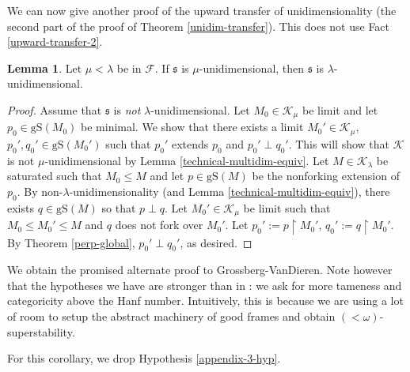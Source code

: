 \documentclass[12pt]{amsart}
\theoremstyle{definition}
\newtheorem{lem}[mydef]{Lemma}
\begin{document}
We can now give another proof of the upward transfer of unidimensionality (the second part of the proof of Theorem \ref{unidim-transfer}). This does not use Fact \ref{upward-transfer-2}.

\begin{lem}\label{unidim-upward}
  Let $\mu < \lambda$ be in ${\mathcal{F}}$. If ${\mathfrak{s}}$ is $\mu$-unidimensional, then ${\mathfrak{s}}$ is $\lambda$-unidimensional.
\end{lem}
\begin{proof}
  Assume that ${\mathfrak{s}}$ is \emph{not} $\lambda$-unidimensional. Let $M_0 \in {\mathcal{K}}_{\mu}$ be limit and let $p_0 \in {\text{gS}} (M_0)$ be minimal. We show that there exists a limit $M_0' \in {\mathcal{K}}_{\mu}$, $p_0', q_0' \in {\text{gS}} (M_0')$ such that $p_0'$ extends $p_0$ and $p_0' \perp q_0'$. This will show that ${\mathcal{K}}$ is not $\mu$-unidimensional by Lemma \ref{technical-multidim-equiv}. Let $M \in {\mathcal{K}}_\lambda$ be saturated such that $M_0 {\le} M$ and let $p \in {\text{gS}} (M)$ be the nonforking extension of $p_0$. By non-$\lambda$-unidimensionality (and Lemma \ref{technical-multidim-equiv}), there exists $q \in {\text{gS}} (M)$ so that $p \perp q$. Let $M_0' \in {\mathcal{K}}_\mu$ be limit such that $M_0 {\le} M_0' {\le} M$ and $q$ does not fork over $M_0'$. Let $p_0' := p {\upharpoonright} M_0'$, $q_0' := q {\upharpoonright} M_0'$. By Theorem \ref{perp-global}, $p_0' \perp q_0'$, as desired.
\end{proof}

We obtain the promised alternate proof to Grossberg-VanDieren. Note however that the hypotheses we have are stronger than in \cite{tamenessthree}: we ask for more tameness and categoricity above the Hanf number. Intuitively, this is because we are using a lot of room to setup the abstract machinery of good frames and obtain $(<\omega)$-superstability.

For this corollary, we drop Hypothesis \ref{appendix-3-hyp}. 
\end{document}
